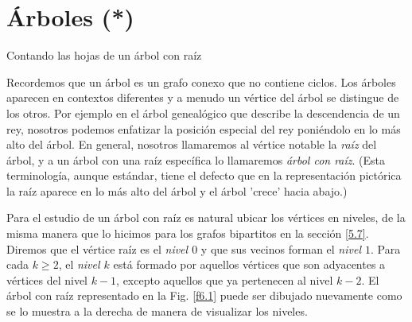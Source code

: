 

\chapter[Árboles]{Árboles (*)}

\begin{section}{Contando las hojas de un árbol con raíz}
\label{6.1}

Recordemos que un {árbol} es un grafo conexo que no contiene ciclos. Los árboles aparecen en contextos diferentes y a menudo un vértice del árbol se distingue de los otros. Por ejemplo en el árbol genealógico que describe la descendencia de un rey, nosotros podemos enfatizar la posición especial del rey poniéndolo en lo
más alto del árbol. En general, nosotros llamaremos al vértice notable la \textit{raíz} del árbol, y a un árbol con una raíz  específica lo llamaremos \textit{árbol con raíz}. (Esta  terminología, aunque estándar, tiene el defecto que en la representación pictórica la raíz aparece en lo
más alto del árbol y el árbol 'crece' hacia abajo.)

Para el estudio de un árbol con raíz es natural ubicar los vértices en niveles, de la misma manera que lo hicimos para los grafos bipartitos en la sección \ref{5.7}. Diremos que el vértice raíz es el \textit{nivel $0$} y que sus vecinos forman el \textit{nivel $1$}.  Para cada $k\ge 2$, el \textit{nivel $k$} está formado por aquellos vértices que son adyacentes a vértices del nivel $k-1$, excepto aquellos que ya pertenecen al nivel $k-2$. El árbol con raíz representado en la Fig. \ref{f6.1} puede ser dibujado nuevamente como se lo muestra a la derecha de manera de visualizar los niveles. 


\end{section}
